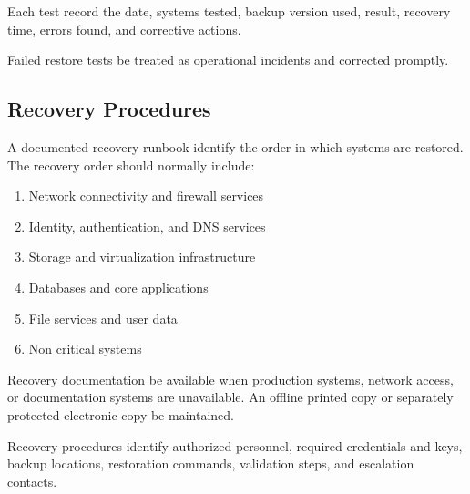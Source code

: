 Each test \should{} record the date, systems tested, backup version used, result, recovery time, errors found, and corrective actions.

Failed restore tests \must{} be treated as operational incidents and corrected promptly.

\subsection{Recovery Procedures}

A documented recovery runbook \must{} identify the order in which systems are restored. The recovery order should normally include:

\begin{enumerate}
    \item Network connectivity and firewall services
    \item Identity, authentication, and DNS services
    \item Storage and virtualization infrastructure
    \item Databases and core applications
    \item File services and user data
    \item Non critical systems
\end{enumerate}

Recovery documentation \must{} be available when production systems, network access, or documentation systems are unavailable. An offline printed copy or separately protected electronic copy \must{} be maintained.

Recovery procedures \should{} identify authorized personnel, required credentials and keys, backup locations, restoration commands, validation steps, and escalation contacts.